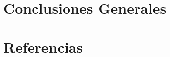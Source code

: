 \documentclass[a4paper,11pt] {article}
\begin{document}
\section{Conclusiones Generales}

\section*{Referencias}
\end{document}
